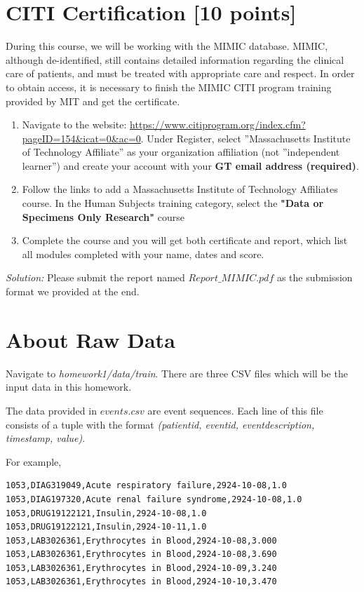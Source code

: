 \documentclass[12pt]{article}
\begin{document}
\section{CITI Certification  [10 points] }
During this course, we will be working with the MIMIC database. MIMIC, although de-identified, still contains detailed information regarding the clinical care of patients, and must be treated with appropriate care and respect. In order to obtain access, it is necessary to finish the MIMIC CITI program training provided by MIT and get the certificate.

\begin{enumerate}
\item Navigate to the website: \url{https://www.citiprogram.org/index.cfm?pageID=154&icat=0&ac=0}. Under Register, select ''Massachusetts Institute of Technology Affiliate'' as your organization affiliation (not ''independent learner'') and create your account with your \textbf{GT email address (required)}.
\item Follow the links to add a Massachusetts Institute of Technology Affiliates course. In the Human Subjects training category, select the \textbf{"Data or Specimens Only Research"} course
\item Complete the course and you will get both certificate and report, which list all modules completed with your name, dates and score.

\end{enumerate}
\textit{Solution:} Please submit the report named \textit{$Report\_ MIMIC.pdf$} as the submission format we provided at the end.\\

\section*{About Raw Data}
Navigate to \textit{homework1/data/train}. There are three CSV files which will be the input data in this homework. 

The data provided in \textit{$events.csv$} are event sequences. Each line of this file consists of a tuple with the format \textit{(patient\textunderscore id, event\textunderscore id, event\textunderscore description, timestamp, value)}. 

For example, 

\begin{lstlisting}[frame=single, language=bash]
1053,DIAG319049,Acute respiratory failure,2924-10-08,1.0
1053,DIAG197320,Acute renal failure syndrome,2924-10-08,1.0
1053,DRUG19122121,Insulin,2924-10-08,1.0
1053,DRUG19122121,Insulin,2924-10-11,1.0
1053,LAB3026361,Erythrocytes in Blood,2924-10-08,3.000
1053,LAB3026361,Erythrocytes in Blood,2924-10-08,3.690
1053,LAB3026361,Erythrocytes in Blood,2924-10-09,3.240
1053,LAB3026361,Erythrocytes in Blood,2924-10-10,3.470
\end{lstlisting}
\end{document}
